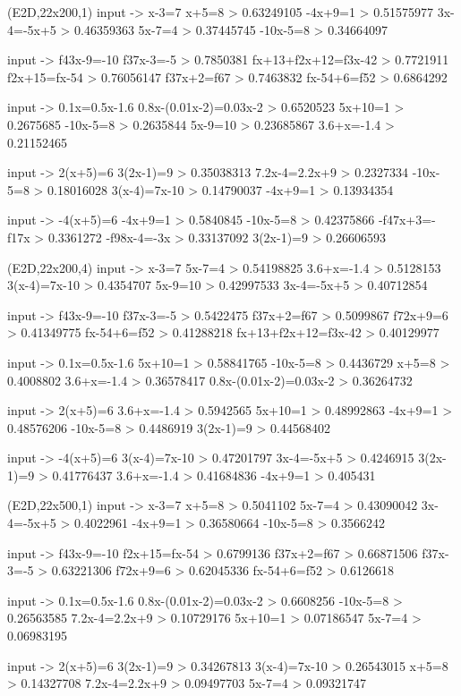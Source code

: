 
(E2D,22x200,1)
input -> x-3=7
x+5=8 > 0.63249105
-4x+9=1 > 0.51575977
3x-4=-5x+5 > 0.46359363
5x-7=4 > 0.37445745
-10x-5=8 > 0.34664097

input -> f{4}{3}x-9=-10
f{3}{7}x-3=-5 > 0.7850381
f{x+1}{3}+f{2x+1}{2}=f{3x-4}{2} > 0.7721911
f{2x+1}{5}=f{x-5}{4} > 0.76056147
f{3}{7}x+2=f{6}{7} > 0.7463832
f{x-5}{4}+6=f{5}{2} > 0.6864292

input -> 0.1x=0.5x-1.6
0.8x-(0.01x-2)=0.03x-2 > 0.6520523
5x+10=1 > 0.2675685
-10x-5=8 > 0.2635844
5x-9=10 > 0.23685867
3.6+x=-1.4 > 0.21152465

input -> 2(x+5)=6
3(2x-1)=9 > 0.35038313
7.2x-4=2.2x+9 > 0.2327334
-10x-5=8 > 0.18016028
3(x-4)=7x-10 > 0.14790037
-4x+9=1 > 0.13934354

input -> -4(x+5)=6
-4x+9=1 > 0.5840845
-10x-5=8 > 0.42375866
-f{4}{7}x+3=-f{1}{7}x > 0.3361272
-f{9}{8}x-4=-3x > 0.33137092
3(2x-1)=9 > 0.26606593

(E2D,22x200,4)
input -> x-3=7
5x-7=4 > 0.54198825
3.6+x=-1.4 > 0.5128153
3(x-4)=7x-10 > 0.4354707
5x-9=10 > 0.42997533
3x-4=-5x+5 > 0.40712854

input -> f{4}{3}x-9=-10
f{3}{7}x-3=-5 > 0.5422475
f{3}{7}x+2=f{6}{7} > 0.5099867
f{7}{2}x+9=6 > 0.41349775
f{x-5}{4}+6=f{5}{2} > 0.41288218
f{x+1}{3}+f{2x+1}{2}=f{3x-4}{2} > 0.40129977

input -> 0.1x=0.5x-1.6
5x+10=1 > 0.58841765
-10x-5=8 > 0.4436729
x+5=8 > 0.4008802
3.6+x=-1.4 > 0.36578417
0.8x-(0.01x-2)=0.03x-2 > 0.36264732

input -> 2(x+5)=6
3.6+x=-1.4 > 0.5942565
5x+10=1 > 0.48992863
-4x+9=1 > 0.48576206
-10x-5=8 > 0.4486919
3(2x-1)=9 > 0.44568402

input -> -4(x+5)=6
3(x-4)=7x-10 > 0.47201797
3x-4=-5x+5 > 0.4246915
3(2x-1)=9 > 0.41776437
3.6+x=-1.4 > 0.41684836
-4x+9=1 > 0.405431

(E2D,22x500,1)
input -> x-3=7
x+5=8 > 0.5041102
5x-7=4 > 0.43090042
3x-4=-5x+5 > 0.4022961
-4x+9=1 > 0.36580664
-10x-5=8 > 0.3566242

input -> f{4}{3}x-9=-10
f{2x+1}{5}=f{x-5}{4} > 0.6799136
f{3}{7}x+2=f{6}{7} > 0.66871506
f{3}{7}x-3=-5 > 0.63221306
f{7}{2}x+9=6 > 0.62045336
f{x-5}{4}+6=f{5}{2} > 0.6126618

input -> 0.1x=0.5x-1.6
0.8x-(0.01x-2)=0.03x-2 > 0.6608256
-10x-5=8 > 0.26563585
7.2x-4=2.2x+9 > 0.10729176
5x+10=1 > 0.07186547
5x-7=4 > 0.06983195

input -> 2(x+5)=6
3(2x-1)=9 > 0.34267813
3(x-4)=7x-10 > 0.26543015
x+5=8 > 0.14327708
7.2x-4=2.2x+9 > 0.09497703
5x-7=4 > 0.09321747

